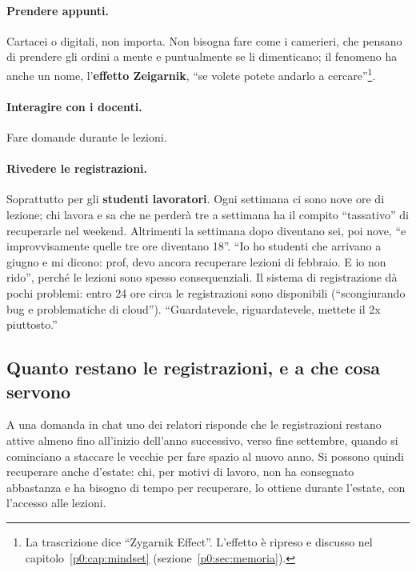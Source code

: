 \paragraph{Prendere appunti.} Cartacei o digitali, non importa. Non bisogna
fare come i camerieri, che pensano di prendere gli ordini a mente e
puntualmente se li dimenticano; il fenomeno ha anche un nome, l'\textbf{effetto
Zeigarnik}, ``se volete potete andarlo a cercare''\footnote{La trascrizione
dice ``Zygarnik Effect''. L'effetto è ripreso e discusso nel
capitolo~\ref{p0:cap:mindset} (sezione~\ref{p0:sec:memoria}).}.

\paragraph{Interagire con i docenti.} Fare domande durante le lezioni.

\paragraph{Rivedere le registrazioni.} Soprattutto per gli
\textbf{studenti lavoratori}. Ogni settimana ci sono nove ore di lezione; chi
lavora e sa che ne perderà tre a settimana ha il compito ``tassativo'' di
recuperarle nel weekend. Altrimenti la settimana dopo diventano sei, poi
nove, ``e improvvisamente quelle tre ore diventano 18''. ``Io ho studenti che
arrivano a giugno e mi dicono: prof, devo ancora recuperare lezioni di
febbraio. E io non rido'', perché le lezioni sono spesso consequenziali. Il
sistema di registrazione dà pochi problemi: entro 24 ore circa le
registrazioni sono disponibili (``scongiurando bug e problematiche di
cloud''). ``Guardatevele, riguardatevele, mettete il 2x piuttosto.''

\subsection{Quanto restano le registrazioni, e a che cosa servono}

A una domanda in chat uno dei relatori risponde che le registrazioni restano
attive almeno fino all'inizio dell'anno successivo, verso fine settembre,
quando si cominciano a staccare le vecchie per fare spazio al nuovo anno.
Si possono quindi recuperare anche d'estate: chi, per motivi di lavoro, non
ha consegnato abbastanza e ha bisogno di tempo per recuperare, lo ottiene
durante l'estate, con l'accesso alle lezioni.


